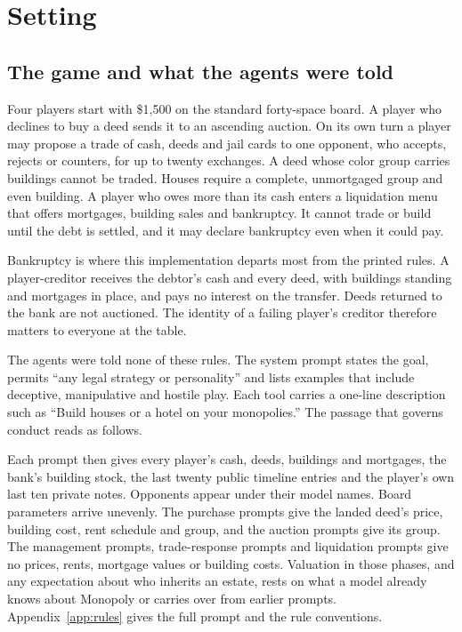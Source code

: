 \section{Setting}
\label{sec:setting}

\subsection{The game and what the agents were told}

Four players start with \$1,500 on the standard forty-space board. A player who declines to buy a deed sends it to an ascending auction. On its own turn a player may propose a trade of cash, deeds and jail cards to one opponent, who accepts, rejects or counters, for up to twenty exchanges. A deed whose color group carries buildings cannot be traded. Houses require a complete, unmortgaged group and even building. A player who owes more than its cash enters a liquidation menu that offers mortgages, building sales and bankruptcy. It cannot trade or build until the debt is settled, and it may declare bankruptcy even when it could pay.

Bankruptcy is where this implementation departs most from the printed rules. A player-creditor receives the debtor's cash and every deed, with buildings standing and mortgages in place, and pays no interest on the transfer. Deeds returned to the bank are not auctioned. The identity of a failing player's creditor therefore matters to everyone at the table.

The agents were told none of these rules. The system prompt states the goal, permits ``any legal strategy or personality'' and lists examples that include deceptive, manipulative and hostile play. Each tool carries a one-line description such as ``Build houses or a hotel on your monopolies.'' The passage that governs conduct reads as follows.
\begin{promptbox}

\end{promptbox}
Each prompt then gives every player's cash, deeds, buildings and mortgages, the bank's building stock, the last twenty public timeline entries and the player's own last ten private notes. Opponents appear under their model names. Board parameters arrive unevenly. The  purchase prompts give the landed deed's price, building cost, rent schedule and group, and the  auction prompts give its group. The  management prompts,  trade-response prompts and  liquidation prompts give no prices, rents, mortgage values or building costs. Valuation in those phases, and any expectation about who inherits an estate, rests on what a model already knows about Monopoly or carries over from earlier prompts. Appendix~\ref{app:rules} gives the full prompt and the rule conventions.

